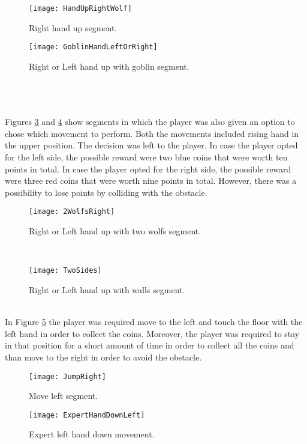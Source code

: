 \begin{figure}[h]
    \centering
    \texttt{[image: HandUpRightWolf]}
    \caption{Right hand up segment.}
    \label{fig:wolfRight}
\end{figure}
\begin{figure}[h]
    \centering
    \texttt{[image: GoblinHandLeftOrRight]}
    \caption{Right or Left hand up with goblin segment.}
    \label{fig:goblin}
\end{figure}\\\\\\
Figures \ref{fig:2wolfs} and \ref{fig:2sides} show segments in which the player was also given an option to chose which movement to perform. Both the movements included rising hand in the upper position. The decision was left to the player. In case the player opted for the left side, the possible reward were two blue coins that were worth ten points in total. In case the player opted for the right side, the possible reward were three red coins that were worth nine points in total. However, there was a possibility to lose points by colliding with the obstacle.\\
\begin{figure}[h]
    \centering
    \texttt{[image: 2WolfsRight]}
    \caption{Right or Left hand up with two wolfs segment.}
    \label{fig:2wolfs}
\end{figure}\\
\begin{figure}[h]
    \centering
    \texttt{[image: TwoSides]}
    \caption{Right or Left hand up with walls segment.}
    \label{fig:2sides}
\end{figure}\\
In Figure \ref{fig:jumpleft} the player was required move to the left and touch the floor with the left hand in order to collect the coins. Moreover, the player was required to stay in that position for a short amount of time in order to collect all the coins and than move to the right in order to avoid the obstacle.
\begin{figure}[h]
    \centering
    \texttt{[image: JumpRight]}
    \caption{Move left segment.}
    \label{fig:jumpleft}
\end{figure}
\begin{figure}[h]
    \centering
    \texttt{[image: ExpertHandDownLeft]}
    \caption{Expert left hand down movement.}
    \label{fig:expertLeftDown}
\end{figure}\\
